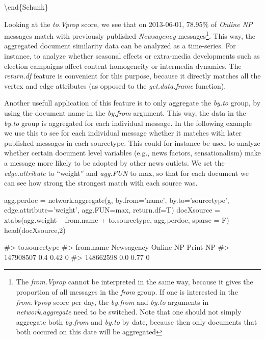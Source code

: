 \textbackslash{}end\{Schunk\}

Looking at the \emph{to.Vprop} score, we see that on 2013-06-01, 78.95\%
of \emph{Online NP} messages match with previously published
\emph{Newsagency}
messages\footnote{The \emph{from.Vprop} cannot be interpreted in the same way, because it gives the proportion of all messages in the \emph{from} group. If one is interested in the \emph{from.Vprop} score per day, the \emph{by.from} and \emph{by.to} arguments in \emph{network.aggregate} need to be switched. Note that one should not simply aggregate both \emph{by.from} and \emph{by.to} by date, because then only documents that both occured on this date will be aggregated}.
This way, the aggregated document similarity data can be analyzed as a
time-series. For instance, to analyze whether seasonal effects or
extra-media developments such as election campaigns affect content
homogeneity or intermedia dynamics. The \emph{return.df} feature is
convenient for this purpose, because it directly matches all the vertex
and edge attributes (as opposed to the \emph{get.data.frame} function).

Another usefull application of this feature is to only aggregate the
\emph{by.to} group, by using the document name in the \emph{by.from}
argument. This way, the data in the \emph{by.to} group is aggregated for
each individual message. In the following example we use this to see for
each individual message whether it matches with later published messages
in each sourcetype. This could for instance be used to analyze whether
certain document level variables (e.g., news factors, sensationalism)
make a message more likely to be adopted by other news outlets. We set
the \emph{edge.attribute} to ``weight'' and \emph{agg.FUN} to max, so
that for each document we can see how strong the strongest match with
each source was.

\begin{Schunk}
\begin{Sinput}
agg.perdoc = network.aggregate(g, by.from='name', by.to='sourcetype', 
                                  edge.attribute='weight', agg.FUN=max, 
                                  return.df=T)
docXsource = xtabs(agg.weight ~ from.name + to.sourcetype, agg.perdoc, sparse = F)
head(docXsource,2)
\end{Sinput}
\begin{Soutput}
#>            to.sourcetype
#> from.name   Newsagency Online NP Print NP
#>   147908507        0.4      0.42        0
#>   148662598        0.0      0.77        0
\end{Soutput}
\end{Schunk}

